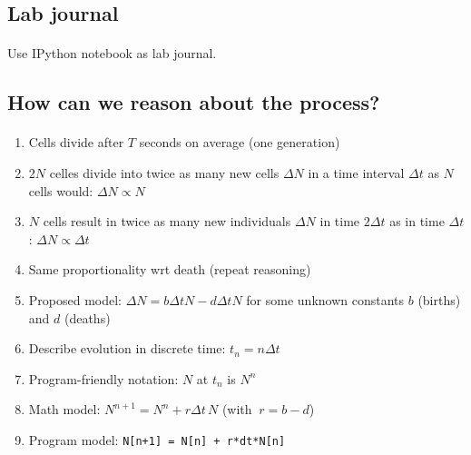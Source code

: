 \documentclass[%
twoside,                 %
final,                   %
10pt]{article}
\begin{document}
\subsection*{Lab journal}


\paragraph{}
Use IPython notebook as lab journal.




\subsection*{How can we reason about the process?}



\paragraph{}
\begin{enumerate}
\item Cells divide after $T$ seconds on average (one generation)

\item $2N$ celles divide into twice as many new cells $\Delta N$ in a time
   interval $\Delta t$ as $N$ cells would: $\Delta N \propto N$

\item $N$ cells result in twice as many new individuals $\Delta N$ in
   time $2\Delta t$ as in time $\Delta t$: $\Delta N \propto\Delta t$

\item Same proportionality wrt death (repeat reasoning)

\item Proposed model: $\Delta N = b\Delta t N - d\Delta tN$ for some unknown
   constants $b$ (births) and $d$ (deaths)

\item Describe evolution in discrete time: $t_n=n\Delta t$

\item Program-friendly notation: $N$ at $t_n$ is $N^n$

\item Math model: $N^{n+1} = N^n + r\Delta t\, N$ (with $\ r=b-d$)

\item Program model: \Verb!N[n+1] = N[n] + r*dt*N[n]!
\end{enumerate}
\end{document}
